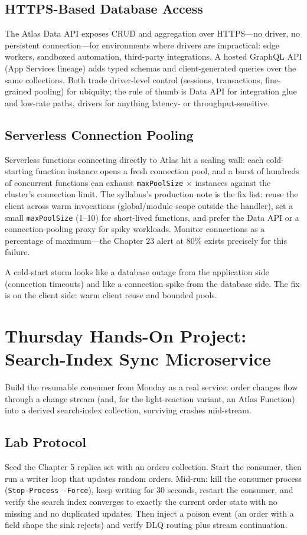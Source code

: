\subsection{HTTPS-Based Database Access}
The Atlas Data API exposes CRUD and aggregation over HTTPS---no driver, no persistent connection---for environments where drivers are impractical: edge workers, sandboxed automation, third-party integrations. A hosted GraphQL API (App Services lineage) adds typed schemas and client-generated queries over the same collections. Both trade driver-level control (sessions, transactions, fine-grained pooling) for ubiquity; the rule of thumb is Data API for integration glue and low-rate paths, drivers for anything latency- or throughput-sensitive.

\subsection{Serverless Connection Pooling}
Serverless functions connecting directly to Atlas hit a scaling wall: each cold-starting function instance opens a fresh connection pool, and a burst of hundreds of concurrent functions can exhaust \texttt{maxPoolSize} $\times$ instances against the cluster's connection limit. The syllabus's production note is the fix list: reuse the client across warm invocations (global/module scope outside the handler), set a small \texttt{maxPoolSize} (1--10) for short-lived functions, and prefer the Data API or a connection-pooling proxy for spiky workloads. Monitor connections as a percentage of maximum---the Chapter 23 alert at 80\% exists precisely for this failure.

\begin{tipbox}
A cold-start storm looks like a database outage from the application side (connection timeouts) and like a connection spike from the database side. The fix is on the client side: warm client reuse and bounded pools.
\end{tipbox}

\section{Thursday Hands-On Project: Search-Index Sync Microservice}
Build the resumable consumer from Monday as a real service: order changes flow through a change stream (and, for the light-reaction variant, an Atlas Function) into a derived search-index collection, surviving crashes mid-stream.

\subsection{Lab Protocol}
Seed the Chapter 5 replica set with an orders collection. Start the consumer, then run a writer loop that updates random orders. Mid-run: kill the consumer process (\texttt{Stop-Process -Force}), keep writing for 30 seconds, restart the consumer, and verify the search index converges to exactly the current order state with no missing and no duplicated updates. Then inject a poison event (an order with a field shape the sink rejects) and verify DLQ routing plus stream continuation.

